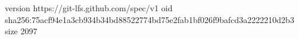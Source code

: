 version https://git-lfs.github.com/spec/v1
oid sha256:75acf94e1a3cb934b34bd88522774bd75e2fab1bf026f9bafcd3a2222210d2b3
size 2097
